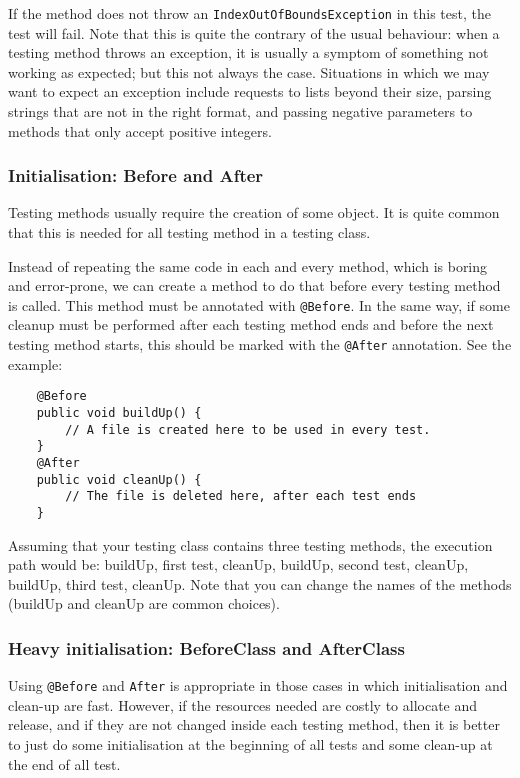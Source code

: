 If the method does not throw an \verb+IndexOutOfBoundsException+ in
this test, the test will fail. Note that this is quite the contrary of
the usual behaviour: when a testing method throws an exception, it is
usually a symptom of something not working as expected; but this not
always the case. Situations in which we may want to expect an exception
include requests to lists beyond their size, parsing strings that
are not in the right format, and passing negative parameters to
methods that only accept positive integers. 

\subsubsection*{Initialisation: Before and After}
\label{sec:init-before-after}

Testing methods usually require the creation of some object. It is
quite common that this is needed for all testing method in a testing
class. 

Instead of repeating the same code in each and every method, which
is boring and error-prone, we can create a method to do that before
every testing method is called. This method must be annotated with
\verb+@Before+. In the same way, if some cleanup must be performed
after each testing method ends and before the next testing method
starts, this should be marked with the \verb+@After+ annotation. See
the example: 

\begin{verbatim}
    @Before
    public void buildUp() {  
        // A file is created here to be used in every test. 
    }  
    @After
    public void cleanUp() {  
        // The file is deleted here, after each test ends
    }  
\end{verbatim}

Assuming that your testing class contains three testing methods, the
execution path would be: buildUp, first test, cleanUp, buildUp, second
test, cleanUp, buildUp, third test, cleanUp. Note that you can change
the names of the methods (buildUp and cleanUp are common choices).

\subsubsection{Heavy initialisation: BeforeClass and AfterClass}
\label{sec:heavy-init-befor}

Using \verb+@Before+ and \verb+After+ is appropriate in those cases in
which initialisation and clean-up are fast. However, if the resources
needed are costly to allocate and release, and if they are not changed
inside each testing method, then it is better to just do some
initialisation at the beginning of all tests and some clean-up at the
end of all test. 

